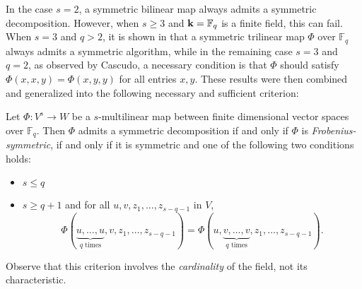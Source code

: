 \documentclass[11pt]{article}
\begin{document}
In the case $s=2$, a symmetric bilinear map always admits a symmetric decomposition.
However, when $s\geq3$ and $\mathbf{k}=\mathbb{F}_q$ is a finite field, this can fail.
When $s=3$ and $q>2$, it is shown in \cite[Lemma~7]{SL84} that a symmetric trilinear map $\Phi$ over $\mathbb{F}_q$ always admits a symmetric algorithm,
while in the remaining case $s=3$ and $q=2$, as observed by Cascudo,
a necessary condition is that $\Phi$ should satisfy $\Phi(x,x,y)=\Phi(x,y,y)$
for all entries $x,y$.
These results were then combined and generalized into the following necessary and sufficient criterion:
\begin{thm}\label{criterion}
Let $\Phi:V^s\to W$ be a $s$-multilinear map between finite dimensional vector spaces over $\mathbb{F}_q$.
Then $\Phi$ admits a symmetric decomposition if and only if $\Phi$ is \emph{Frobenius-symmetric},
\ie if and only if it is symmetric and one of the following two conditions holds:
\begin{itemize}
\item $s\leq q$
\item $s\geq q+1$ and for all $u,v,z_1,\dots,z_{s-q-1}$ in $V$,
\[
\Phi(\underset{\textrm{$q$ times}}{\underbrace{u,\dots,u}},v,z_1,\dots,z_{s-q-1})=\Phi(u,\underset{\textrm{$q$ times}}{\underbrace{v,\dots,v}},z_1,\dots,z_{s-q-1}).
\]
\end{itemize}
\end{thm}
Observe that this criterion involves the \emph{cardinality} of the field, not its characteristic.
\end{document}
